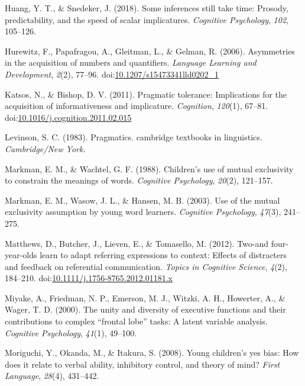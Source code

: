 \documentclass[man]{apa6}
\theoremstyle{definition}
\theoremstyle{definition}
\theoremstyle{definition}
\theoremstyle{remark}
\begin{document}
\hypertarget{ref-huang2018}{}
Huang, Y. T., \& Snedeker, J. (2018). Some inferences still take time:
Prosody, predictability, and the speed of scalar implicatures.
\emph{Cognitive Psychology}, \emph{102}, 105--126.

\hypertarget{ref-hurewitz2006}{}
Hurewitz, F., Papafragou, A., Gleitman, L., \& Gelman, R. (2006).
Asymmetries in the acquisition of numbers and quantifiers.
\emph{Language Learning and Development}, \emph{2}(2), 77--96.
doi:\href{https://doi.org/10.1207/s15473341lld0202_1}{10.1207/s15473341lld0202\_1}

\hypertarget{ref-katsos2011}{}
Katsos, N., \& Bishop, D. V. (2011). Pragmatic tolerance: Implications
for the acquisition of informativeness and implicature.
\emph{Cognition}, \emph{120}(1), 67--81.
doi:\href{https://doi.org/10.1016/j.cognition.2011.02.015}{10.1016/j.cognition.2011.02.015}

\hypertarget{ref-levinson1983}{}
Levinson, S. C. (1983). Pragmatics. cambridge textbooks in linguistics.
\emph{Cambridge/New York}.

\hypertarget{ref-markman1988children}{}
Markman, E. M., \& Wachtel, G. F. (1988). Children's use of mutual
exclusivity to constrain the meanings of words. \emph{Cognitive
Psychology}, \emph{20}(2), 121--157.

\hypertarget{ref-markman2003use}{}
Markman, E. M., Wasow, J. L., \& Hansen, M. B. (2003). Use of the mutual
exclusivity assumption by young word learners. \emph{Cognitive
Psychology}, \emph{47}(3), 241--275.

\hypertarget{ref-matthews2012}{}
Matthews, D., Butcher, J., Lieven, E., \& Tomasello, M. (2012). Two-and
four-year-olds learn to adapt referring expressions to context: Effects
of distracters and feedback on referential communication. \emph{Topics
in Cognitive Science}, \emph{4}(2), 184--210.
doi:\href{https://doi.org/10.1111/j.1756-8765.2012.01181.x}{10.1111/j.1756-8765.2012.01181.x}

\hypertarget{ref-miyake2000unity}{}
Miyake, A., Friedman, N. P., Emerson, M. J., Witzki, A. H., Howerter,
A., \& Wager, T. D. (2000). The unity and diversity of executive
functions and their contributions to complex ``frontal lobe'' tasks: A
latent variable analysis. \emph{Cognitive Psychology}, \emph{41}(1),
49--100.

\hypertarget{ref-moriguchi2008young}{}
Moriguchi, Y., Okanda, M., \& Itakura, S. (2008). Young children's yes
bias: How does it relate to verbal ability, inhibitory control, and
theory of mind? \emph{First Language}, \emph{28}(4), 431--442.
\end{document}
